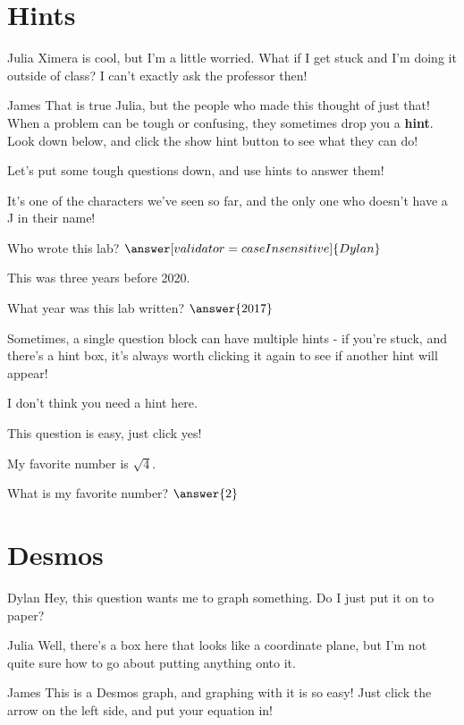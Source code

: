 \documentclass{ximera}
\begin{document}
\section{Hints}
\begin{dialogue}
\item[Julia] Ximera is cool, but I'm a little worried. What if I get stuck and I'm doing it outside of class? I can't exactly ask the professor then!
\item[James] That is true Julia, but the people who made this thought of just that! When a problem can be tough or confusing, they sometimes drop you a \textbf{hint}. Look down below, and click the show hint button to see what they can do!
\end{dialogue}

Let's put some tough questions down, and use hints to answer them!
\begin{question}
\begin{hint}
It's one of the characters we've seen so far, and the only one who doesn't have a J in their name!
\end{hint}
Who wrote this lab?
$\answer[validator = caseInsensitive]{Dylan}$
\end{question}
\begin{question}
\begin{hint}
This was three years before 2020.
\end{hint}
What year was this lab written?
$\answer{2017}$
\end{question}

Sometimes, a single question block can have multiple hints - if you're stuck, and there's a hint box, it's always worth clicking it again to see if another hint will appear!

\begin{question}
\begin{hint}
I don't think you need a hint here.
\end{hint}
This question is easy, just click yes!
\begin{multipleChoice}
\end{multipleChoice}

\begin{hint}
My favorite number is $\sqrt{4}$.
\end{hint}
What is my favorite number?
$\answer{2}$
\end{question}

\section{Desmos}
\begin{dialogue}
\item[Dylan] Hey, this question wants me to graph something. Do I just put it on to paper?
\item[Julia] Well, there's a box here that looks like a coordinate plane, but I'm not quite sure how to go about putting anything onto it.
\item[James] This is a Desmos graph, and graphing with it is so easy! Just click the arrow on the left side, and put your equation in!
\end{dialogue}
\end{document}
